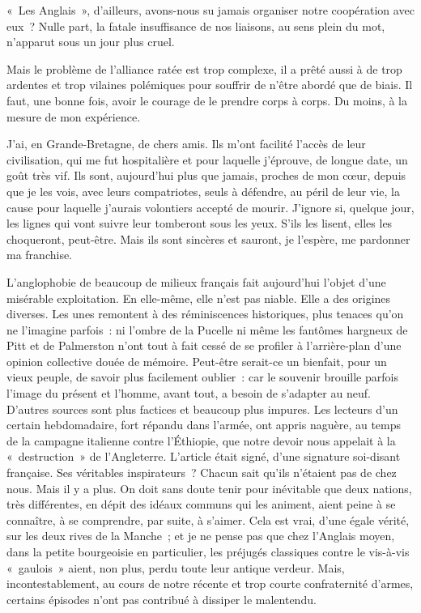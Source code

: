 \documentclass[french,twoside]{book} %
\begin{document}
\noindent « Les Anglais », d’ailleurs, avons-nous su jamais organiser notre coopération avec eux ? Nulle part,   la fatale insuffisance de nos liaisons, au sens plein du mot, n’apparut sous un jour plus cruel.\par
Mais le problème de l’alliance ratée est trop complexe, il a prêté aussi à de trop ardentes et trop vilaines polémiques pour souffrir de n’être abordé que de biais. Il faut, une bonne fois, avoir le courage de le prendre corps à corps. Du moins, à la mesure de mon expérience.\par
J’ai, en Grande-Bretagne, de chers amis. Ils m’ont facilité l’accès de leur civilisation, qui me fut hospitalière et pour laquelle j’éprouve, de longue date, un goût très vif. Ils sont, aujourd’hui plus que jamais, proches de mon cœur, depuis que je les vois, avec leurs compatriotes, seuls à défendre, au péril de leur vie, la cause pour laquelle j’aurais volontiers accepté de mourir. J’ignore si, quelque jour, les lignes qui vont suivre leur tomberont sous les yeux. S’ils les lisent, elles les choqueront, peut-être. Mais ils sont sincères et sauront, je l’espère, me pardonner ma franchise.\par
L’anglophobie de beaucoup de milieux français fait aujourd’hui l’objet d’une misérable exploitation. En elle-même, elle n’est pas niable. Elle a des origines diverses. Les unes remontent à des réminiscences historiques, plus tenaces qu’on ne l’imagine parfois : ni l’ombre de la Pucelle ni même les fantômes hargneux de Pitt et de Palmerston n’ont tout à fait cessé de se profiler à l’arrière-plan d’une opinion collective douée de mémoire. Peut-être serait-ce un bienfait, pour un vieux peuple, de savoir plus facilement oublier : car le souvenir brouille parfois l’image du présent et l’homme, avant tout, a besoin de s’adapter au neuf. D’autres sources sont plus factices et beaucoup plus impures. Les lecteurs d’un certain hebdomadaire, fort répandu dans l’armée, ont appris naguère, au temps de la campagne italienne contre l’Éthiopie, que notre devoir nous appelait à la « destruction » de l’Angleterre. L’article était   signé, d’une signature soi-disant française. Ses véritables inspirateurs ? Chacun sait qu’ils n’étaient pas de chez nous. Mais il y a plus. On doit sans doute tenir pour inévitable que deux nations, très différentes, en dépit des idéaux communs qui les animent, aient peine à se connaître, à se comprendre, par suite, à s’aimer. Cela est vrai, d’une égale vérité, sur les deux rives de la Manche ; et je ne pense pas que chez l’Anglais moyen, dans la petite bourgeoisie en particulier, les préjugés classiques contre le vis-à-vis « gaulois » aient, non plus, perdu toute leur antique verdeur. Mais, incontestablement, au cours de notre récente et trop courte confraternité d’armes, certains épisodes n’ont pas contribué à dissiper le malentendu.\par
\end{document}
